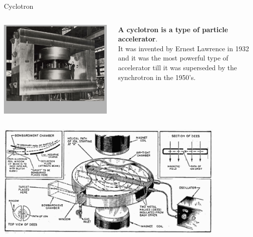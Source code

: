 \begin{frame}{Cyclotron}

\begin{columns}
  \begin{column}{0.20\textwidth}
     \begin{center}
       \includegraphics[width=0.99\textwidth]{./images/photos/cyclotron.jpg}\\
     \end{center}
  \end{column}
  \begin{column}{0.70\textwidth}
          {\bf A cyclotron is a type of particle accelerator}.\\
          It was invented by Ernest Lawrence in 1932 and it was the most powerful
          type of accelerator till it was superseded by the synchrotron in the 1950's.
  \end{column}
\end{columns}

\begin{center}
    \includegraphics[width=0.85\textwidth]{./images/schematics/cyclotron_diagram.png}\\
\end{center}

\end{frame}

